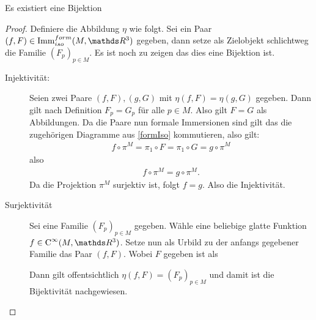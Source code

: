 \begin{Lem}\label{lem:famiso}
  Es existiert eine Bijektion
	
  \begin{proof}
    Definiere die Abbildung $ \eta $ wie folgt. Sei ein Paar
    $ (f,F) \in \Immfi{M}{\R^3}$ gegeben, dann setze als Zielobjekt
    schlichtweg die Familie $ (F_p)_{p\in M} $. Es ist noch zu zeigen
    das dies eine Bijektion ist.
    \begin{description}
    \item[Injektivität:] Seien zwei Paare $ (f,F),(g,G) $ mit
      $ \eta(f,F)=\eta(g,G) $ gegeben. Dann gilt nach Definition
      $ F_p = G_p $ für alle $ p\in M $. Also gilt $ F=G $ als
      Abbildungen. Da die Paare nun formale Immersionen sind gilt das
      die zugehörigen Diagramme aus \cref{formIso} kommutieren, also
      gilt:
      \begin{gather*}
        f \circ \pi^M = \pi_1 \circ F = \pi_1 \circ G = g \circ \pi^M
      \end{gather*}
      also
      \begin{gather*}
        f \circ \pi^M = g \circ \pi^M.
      \end{gather*}  Da die Projektion $ \pi^M $ surjektiv ist, folgt
      $ f=g $.  Also die Injektivität.
    \item[Surjektivität] Sei eine Familie $ (F_p)_{p\in M} $
      gegeben. Wähle eine beliebige glatte Funktion
      $ f\in \Cinfty{M}{\R^3} $. Setze nun als Urbild zu der anfangs
      gegebener Familie das Paar $ (f,F) $. Wobei $ F $ gegeben ist als
			 
      Dann gilt offentsichtlich $ \eta(f,F)=(F_p)_{p\in M} $ und damit
      ist die Bijektivität nachgewiesen.
    \end{description}
  \end{proof}
\end{Lem}

